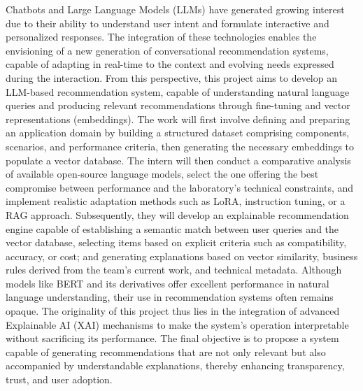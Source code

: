 \documentclass{article}
\begin{document}
Chatbots and Large Language Models (LLMs) have generated growing interest due to their ability to understand user intent and formulate interactive and personalized responses. The integration of these technologies enables the envisioning of a new generation of conversational recommendation systems, capable of adapting in real-time to the context and evolving needs expressed during the interaction. From this perspective, this project aims to develop an LLM-based recommendation system, capable of understanding natural language queries and producing relevant recommendations through fine-tuning and vector representations (embeddings). The work will first involve defining and preparing an application domain by building a structured dataset comprising components, scenarios, and performance criteria, then generating the necessary embeddings to populate a vector database. The intern will then conduct a comparative analysis of available open-source language models, select the one offering the best compromise between performance and the laboratory's technical constraints, and implement realistic adaptation methods such as LoRA, instruction tuning, or a RAG approach. Subsequently, they will develop an explainable recommendation engine capable of establishing a semantic match between user queries and the vector database, selecting items based on explicit criteria such as compatibility, accuracy, or cost; and generating explanations based on vector similarity, business rules derived from the team's current work, and technical metadata. Although models like BERT and its derivatives offer excellent performance in natural language understanding, their use in recommendation systems often remains opaque. The originality of this project thus lies in the integration of advanced Explainable AI (XAI) mechanisms to make the system's operation interpretable without sacrificing its performance. The final objective is to propose a system capable of generating recommendations that are not only relevant but also accompanied by understandable explanations, thereby enhancing transparency, trust, and user adoption.


\end{document}
